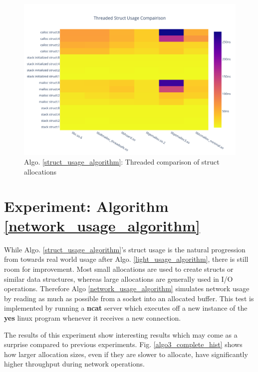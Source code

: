 \documentclass[letterpaper, 10 pt, conference]{ieeeconf}  %
\begin{document}
\begin{figure}[tbh!]
  \centering
  \includegraphics[width=\columnwidth]{graphs/struct_threaded_hist.png}
  \caption{ Algo. \ref{struct_usage_algorithm}: Threaded comparison of struct allocations }
  \label{algo2_complete_threaded_hist}
\end{figure}

\section{Experiment: Algorithm \ref{network_usage_algorithm}}

While Algo. \ref{struct_usage_algorithm}'s struct usage is the natural progression from towards real world usage after Algo. \ref{light_usage_algorithm}, there is still room for improvement.
Most small allocations are used to create structs or similar data structures, whereas large allocations are generally used in I/O operations.
Therefore Algo \ref{network_usage_algorithm} simulates network usage by reading as much as possible from a socket into an allocated buffer.
This test is implemented by running a \textbf{ncat} server which executes off a new instance of the \textbf{yes} linux program whenever it receives a new connection.

The results of this experiment show interesting results which may come as a surprise compared to previous experiments.
Fig. \ref{algo3_complete_hist} shows how larger allocation sizes, even if they are slower to allocate, have significantly higher throughput during network operations.
\end{document}
